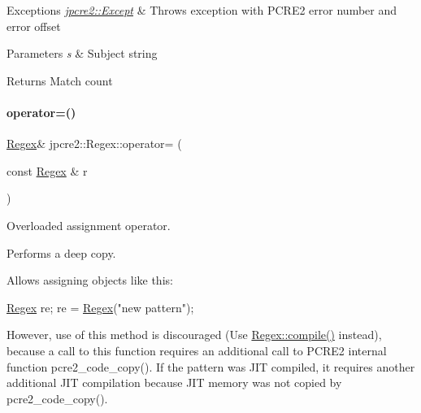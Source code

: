 \begin{DoxyExceptions}{Exceptions}
{\em \hyperlink{classjpcre2_1_1Except}{jpcre2\+::\+Except}} & Throws exception with P\+C\+R\+E2 error number and error offset \\
\hline
\end{DoxyExceptions}

\begin{DoxyParams}{Parameters}
{\em s} & Subject string \\
\hline
\end{DoxyParams}
\begin{DoxyReturn}{Returns}
Match count 
\end{DoxyReturn}
\hypertarget{classjpcre2_1_1Regex_ab43a14b4b6e75b7fa3221bc18a1d4121_ab43a14b4b6e75b7fa3221bc18a1d4121}{}\label{classjpcre2_1_1Regex_ab43a14b4b6e75b7fa3221bc18a1d4121_ab43a14b4b6e75b7fa3221bc18a1d4121} 
\paragraph{\texorpdfstring{operator=()}{operator=()}}
{\footnotesize\ttfamily \hyperlink{classjpcre2_1_1Regex}{Regex}\& jpcre2\+::\+Regex\+::operator= (\begin{DoxyParamCaption}\item[{const \hyperlink{classjpcre2_1_1Regex}{Regex} \&}]{r }\end{DoxyParamCaption})\hspace{0.3cm}{\ttfamily [inline]}}



Overloaded assignment operator. 

Performs a deep copy.

Allows assigning objects like this\+: 
\begin{DoxyCode}
\hyperlink{classjpcre2_1_1Regex_a302f65cd5747c5d34570ca76516ab715_a302f65cd5747c5d34570ca76516ab715}{Regex} re;
re = \hyperlink{classjpcre2_1_1Regex_a302f65cd5747c5d34570ca76516ab715_a302f65cd5747c5d34570ca76516ab715}{Regex}(\textcolor{stringliteral}{"new pattern"});
\end{DoxyCode}
 However, use of this method is discouraged (Use \hyperlink{classjpcre2_1_1Regex_aad1d5ef1e87f762f68a587eec4022e69_aad1d5ef1e87f762f68a587eec4022e69}{Regex\+::compile()} instead), because a call to this function requires an additional call to P\+C\+R\+E2 internal function pcre2\+\_\+code\+\_\+copy(). If the pattern was J\+IT compiled, it requires another additional J\+IT compilation because J\+IT memory was not copied by pcre2\+\_\+code\+\_\+copy().

